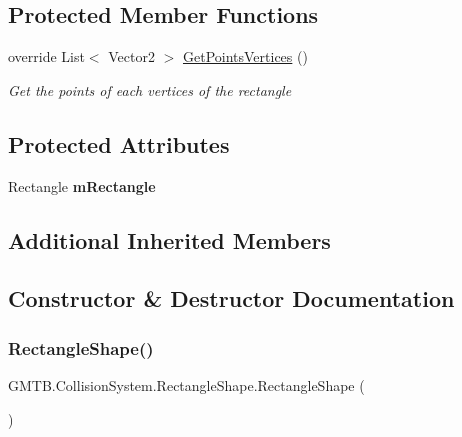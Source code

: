 \subsection*{Protected Member Functions}
\begin{DoxyCompactItemize}
\item 
override List$<$ Vector2 $>$ \mbox{\hyperlink{class_g_m_t_b_1_1_collision_system_1_1_rectangle_shape_a767bc8cd54c3eaafb7a0e8a7080e0a37}{Get\+Points\+Vertices}} ()
\begin{DoxyCompactList}\small\item\em Get the points of each vertices of the rectangle \end{DoxyCompactList}\end{DoxyCompactItemize}
\subsection*{Protected Attributes}
\begin{DoxyCompactItemize}
\item 
\mbox{\label{class_g_m_t_b_1_1_collision_system_1_1_rectangle_shape_af808b90291fa154ad55ad4932b837205}} 
Rectangle {\bfseries m\+Rectangle}
\end{DoxyCompactItemize}
\subsection*{Additional Inherited Members}


\subsection{Constructor \& Destructor Documentation}
\mbox{\label{class_g_m_t_b_1_1_collision_system_1_1_rectangle_shape_a4fe79dc84506739797375a1c35f188d2}} 
\subsubsection{\texorpdfstring{RectangleShape()}{RectangleShape()}}
{\footnotesize\ttfamily G\+M\+T\+B.\+Collision\+System.\+Rectangle\+Shape.\+Rectangle\+Shape (\begin{DoxyParamCaption}{ }\end{DoxyParamCaption})}



